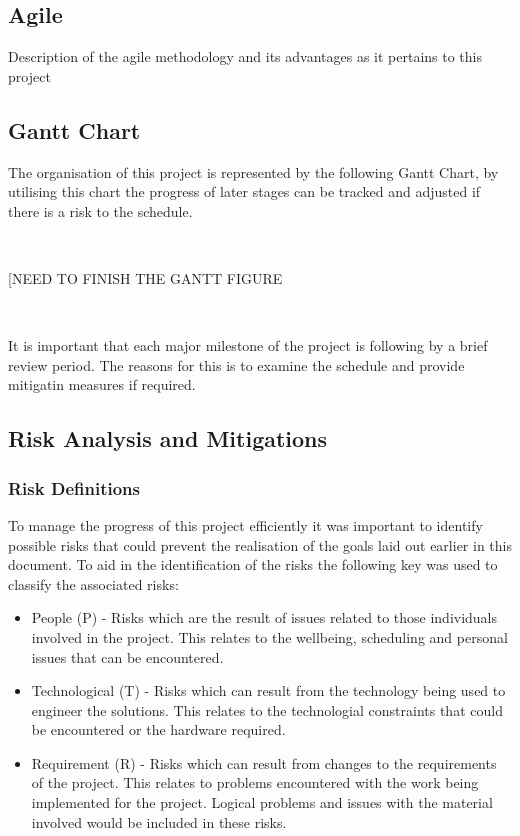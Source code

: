\documentclass[12pt]{article}  %
\theoremstyle{definition}
\theoremstyle{remark}
\begin{document}
\subsection {Agile}

Description of the agile methodology and its advantages as it pertains to this project

\subsection {Gantt Chart}

The organisation of this project is represented by the following Gantt Chart, by utilising this chart the progress of later stages can be tracked and adjusted if there is a risk to the schedule.

\

[NEED TO FINISH THE GANTT FIGURE

\

It is important that each major milestone of the project is following by a brief review period. The reasons for this is to examine the schedule and provide mitigatin measures if required.

\subsection {Risk Analysis and Mitigations}

\subsubsection {Risk Definitions}
To manage the progress of this project efficiently it was important to identify possible risks that could prevent the realisation of the goals laid out earlier in this document. To aid in the identification of the risks the following key was used to classify the associated risks:
\begin{itemize}
\item{People (P) - Risks which are the result of issues related to those individuals involved in the project. This relates to the wellbeing, scheduling and personal issues that can be encountered.}
\item{Technological (T) - Risks which can result from the technology being used to engineer the solutions. This relates to the technologial constraints that could be encountered or the hardware required.}
\item{Requirement (R)  - Risks which can result from changes to the requirements of the project. This relates to problems encountered with the work being implemented for the project. Logical problems and issues with the material involved would be included in these risks.}
\end{itemize}
\end{document}
